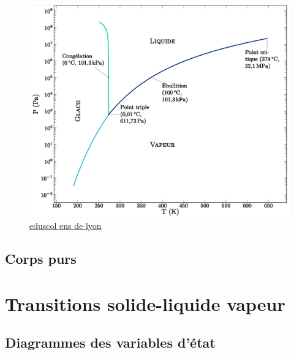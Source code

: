 \documentclass[10pt]{beamer}
\begin{document}
\begin{frame}{\insertsubsection}
    \begin{figure}
        \centering
        \includegraphics[width= .7\textwidth]{Point_triple_deleau_enslyon.png}
        \caption{\href{https://planet-terre.ens-lyon.fr/ressource/diagramme-lineaire-log.xml}{eduscol ens de lyon}}
    \end{figure}
\end{frame}

\subsection{Corps purs}

\section{Transitions solide-liquide vapeur}
\subsection{Diagrammes des variables d'état}
\end{document}
